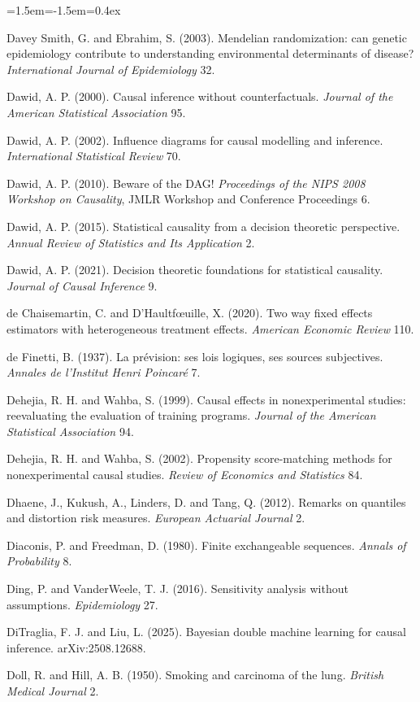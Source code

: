 \begin{list}{}{\leftmargin=1.5em\itemindent=-1.5em\itemsep=0.4ex}
\item Davey Smith, G. and Ebrahim, S. (2003). Mendelian randomization: can genetic epidemiology contribute to understanding environmental determinants of disease? \emph{International Journal of Epidemiology} 32.
\item Dawid, A. P. (2000). Causal inference without counterfactuals. \emph{Journal of the American Statistical Association} 95.
\item Dawid, A. P. (2002). Influence diagrams for causal modelling and inference. \emph{International Statistical Review} 70.
\item Dawid, A. P. (2010). Beware of the DAG! \emph{Proceedings of the NIPS 2008 Workshop on Causality}, JMLR Workshop and Conference Proceedings 6.
\item Dawid, A. P. (2015). Statistical causality from a decision theoretic perspective. \emph{Annual Review of Statistics and Its Application} 2.
\item Dawid, A. P. (2021). Decision theoretic foundations for statistical causality. \emph{Journal of Causal Inference} 9.
\item de Chaisemartin, C. and D'Haultf\oe uille, X. (2020). Two way fixed effects estimators with heterogeneous treatment effects. \emph{American Economic Review} 110.
\item de Finetti, B. (1937). La pr\'evision: ses lois logiques, ses sources subjectives. \emph{Annales de l'Institut Henri Poincar\'e} 7.
\item Dehejia, R. H. and Wahba, S. (1999). Causal effects in nonexperimental studies: reevaluating the evaluation of training programs. \emph{Journal of the American Statistical Association} 94.
\item Dehejia, R. H. and Wahba, S. (2002). Propensity score-matching methods for nonexperimental causal studies. \emph{Review of Economics and Statistics} 84.
\item Dhaene, J., Kukush, A., Linders, D. and Tang, Q. (2012). Remarks on quantiles and distortion risk measures. \emph{European Actuarial Journal} 2.
\item Diaconis, P. and Freedman, D. (1980). Finite exchangeable sequences. \emph{Annals of Probability} 8.
\item Ding, P. and VanderWeele, T. J. (2016). Sensitivity analysis without assumptions. \emph{Epidemiology} 27.
\item DiTraglia, F. J. and Liu, L. (2025). Bayesian double machine learning for causal inference. arXiv:2508.12688.
\item Doll, R. and Hill, A. B. (1950). Smoking and carcinoma of the lung. \emph{British Medical Journal} 2.

\end{list}
